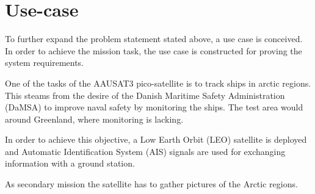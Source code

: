 \section{Use-case}\label{sec:useCase}
To further expand the problem statement stated above, a use case is conceived. In order to achieve the mission task, the use case is constructed for proving the system requirements.

One of the tasks of the AAUSAT3 pico-satellite is to track ships in arctic regions. This steams from the desire of the Danish Maritime Safety Administration (DaMSA) to improve naval safety by monitoring the ships. The test area would around Greenland, where monitoring is lacking. %

In order to achieve this objective, a Low Earth Orbit  (LEO)  satellite is deployed and Automatic Identification System (AIS) signals are used for exchanging information with a ground station.

As secondary mission the satellite has to gather pictures of the Arctic regions.
